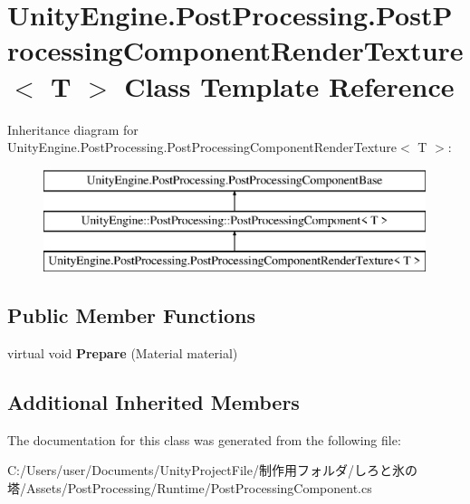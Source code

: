\hypertarget{class_unity_engine_1_1_post_processing_1_1_post_processing_component_render_texture}{}\section{Unity\+Engine.\+Post\+Processing.\+Post\+Processing\+Component\+Render\+Texture$<$ T $>$ Class Template Reference}
\label{class_unity_engine_1_1_post_processing_1_1_post_processing_component_render_texture}
Inheritance diagram for Unity\+Engine.\+Post\+Processing.\+Post\+Processing\+Component\+Render\+Texture$<$ T $>$\+:\begin{figure}[H]
\begin{center}
\leavevmode
\includegraphics[height=3.000000cm]{class_unity_engine_1_1_post_processing_1_1_post_processing_component_render_texture}
\end{center}
\end{figure}
\subsection*{Public Member Functions}
\begin{DoxyCompactItemize}
\item 
\mbox{\label{class_unity_engine_1_1_post_processing_1_1_post_processing_component_render_texture_adcf0697959b318bf65a96ce47ee26732}} 
virtual void {\bfseries Prepare} (Material material)
\end{DoxyCompactItemize}
\subsection*{Additional Inherited Members}


The documentation for this class was generated from the following file\+:\begin{DoxyCompactItemize}
\item 
C\+:/\+Users/user/\+Documents/\+Unity\+Project\+File/制作用フォルダ/しろと氷の塔/\+Assets/\+Post\+Processing/\+Runtime/Post\+Processing\+Component.\+cs\end{DoxyCompactItemize}
